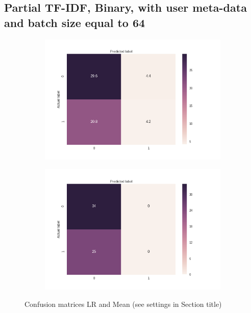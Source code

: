 \documentclass[sigconf]{acmart-txmm}
\begin{document}
\subsection{Partial TF-IDF, Binary, with user meta-data and batch size equal to 64}

\begin{figure}[H]
\centering
\begin{subfigure}
  \centering
  \includegraphics[width=1\linewidth]{report/img/conf_matrices/keywords_tfidf_p_binary_0_1_64_LR.png}
  \label{fig:keywords_tfidf_p_binary_0_1_64_LR}
\end{subfigure}%
\begin{subfigure}
  \centering
  \includegraphics[width=1\linewidth]{report/img/conf_matrices/keywords_tfidf_p_binary_0_1_64_mean.png}
  \label{fig:keywords_tfidf_p_binary_0_1_64_mean}
\end{subfigure}
\caption{Confusion matrices LR and Mean (see settings in Section title)}
\label{fig:keywords_tfidf_p_binary_0_1_64}
\end{figure}
\end{document}
